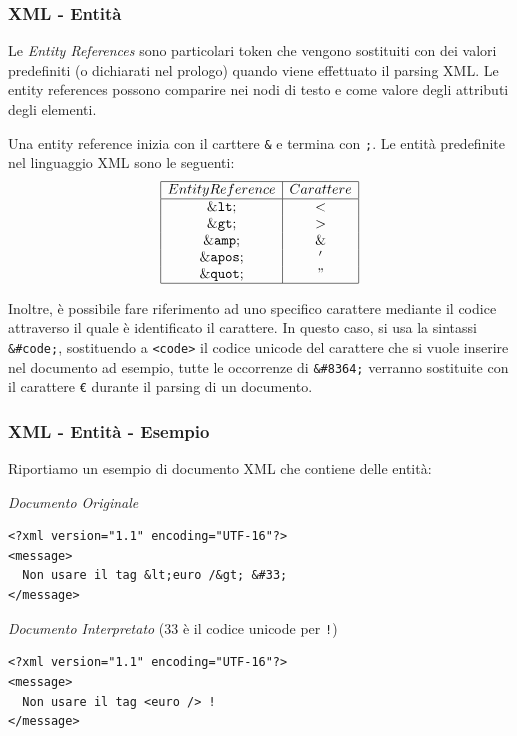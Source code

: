 \documentclass[8pt]{beamer}
\begin{document}
\begin{frame}
 \frametitle{XML - Entit\`a}
 
 Le \emph{Entity References} sono particolari token che 
 vengono sostituiti con dei valori predefiniti (o dichiarati nel prologo)
 quando viene effettuato il parsing XML. Le entity references possono 
 comparire nei nodi di testo e come valore degli attributi degli elementi.
 \vspace{\baselineskip}
 
 Una entity reference inizia con il carttere \texttt{\&} e termina con \texttt{;}.
 Le entit\`a predefinite nel linguaggio XML sono le seguenti:
\[
 \begin{array}{|c|c|}
  \hline
    Entity Reference & Carattere \\
    \hline
    \mathtt{\&lt;} & \mathtt{<} \\
    \mathtt{\&gt;} & \mathtt{>} \\
    \mathtt{\&amp;} & \mathtt{\&}\\ 
    \mathtt{\&apos;} & \mathtt{'}\\
    \mathtt{\&quot;} & \mathtt{"}\\
  \hline
 \end{array}
\]
 \vspace{\baselineskip}

 Inoltre, \`e possibile fare riferimento ad uno specifico carattere
 mediante il codice attraverso il quale \`e identificato il carattere.
 In questo caso, si usa la sintassi \texttt{\&\#code;}, sostituendo 
 a \texttt{<code>} il codice unicode del carattere che si vuole inserire
 nel documento
 ad esempio, tutte le occorrenze di \texttt{\&\#8364;} verranno 
 sostituite con il carattere \texttt{\euro} durante il parsing di un 
 documento.
\end{frame}

\begin{frame}[fragile]
 \frametitle{XML - Entit\`a - Esempio}
 Riportiamo un esempio di documento XML che contiene delle entit\`a:
 \vspace{\baselineskip}
 
 \emph{Documento Originale}
\begin{small}
\begin{verbatim}
<?xml version="1.1" encoding="UTF-16"?>
<message>
  Non usare il tag &lt;euro /&gt; &#33;
</message>
\end{verbatim}
\end{small}

 \emph{Documento Interpretato} (33 \`e il codice unicode per \texttt{!})
\begin{small}
\begin{verbatim}
<?xml version="1.1" encoding="UTF-16"?>
<message>
  Non usare il tag <euro /> !
</message>
\end{verbatim}
\end{small} 
\end{frame}
\end{document}
